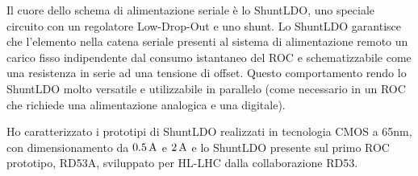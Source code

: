
Il cuore dello schema di alimentazione seriale \`e lo ShuntLDO, uno speciale circuito con un regolatore Low-Drop-Out e uno shunt. Lo ShuntLDO garantisce che l'elemento nella catena seriale presenti al sistema di alimentazione remoto un carico fisso indipendente dal consumo istantaneo del ROC e schematizzabile come una resistenza in serie ad una tensione di offset. Questo comportamento rendo lo ShuntLDO molto versatile e utilizzabile in parallelo (come necessario in un ROC che richiede una alimentazione analogica e una digitale).

Ho caratterizzato i prototipi di ShuntLDO realizzati in tecnologia CMOS a 65nm, con dimensionamento da $0.5\rm \, A$ e $2\rm \, A$ e lo ShuntLDO presente sul primo ROC prototipo, RD53A, sviluppato per HL-LHC dalla collaborazione RD53.




